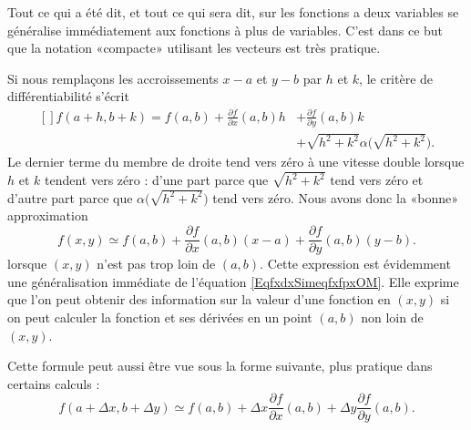 \begin{remark}
    Tout ce qui a été dit, et tout ce qui sera dit, sur les fonctions a deux variables se généralise immédiatement aux fonctions à plus de variables. C'est dans ce but que la notation «compacte» utilisant les vecteurs est très pratique.
\end{remark}

Si nous remplaçons les accroissements $x-a$ et $y-b$ par $h$ et $k$, le critère de différentiabilité s'écrit
\begin{equation}
    \begin{aligned}[]
        f(a+h,b+k)=f(a,b)+\frac{ \partial f }{ \partial x }(a,b)h&+\frac{ \partial f }{ \partial y }(a,b)k\\
        &+\sqrt{h^2+k^2}\alpha\big( \sqrt{h^2+k^2} \big).
    \end{aligned}
\end{equation}
Le dernier terme du membre de droite tend vers zéro à une vitesse double lorsque $h$ et $k$ tendent vers zéro : d'une part parce que $\sqrt{h^2+k^2}$ tend vers zéro et d'autre part parce que $\alpha\big( \sqrt{h^2+k^2} \big)$ tend vers zéro. Nous avons donc la «bonne» approximation
\begin{equation}        \label{EqFormApproxfxyabOM}
    f(x,y)\simeq f(a,b)+\frac{ \partial f }{ \partial x }(a,b)(x-a)+\frac{ \partial f }{ \partial y }(a,b)(y-b).
\end{equation}
lorsque $(x,y)$ n'est pas trop loin de $(a,b)$. Cette expression est évidemment une généralisation immédiate de l'équation \eqref{EqfxdxSimeqfxfpxOM}. Elle exprime que l'on peut obtenir des information sur la valeur d'une fonction en $(x,y)$ si on peut calculer la fonction et ses dérivées en un point $(a,b)$ non loin de $(x,y)$.

Cette formule peut aussi être vue sous la forme suivante, plus pratique dans certains calculs :
\begin{equation}        \label{EqFormApproxfxyabDFOM}
    f(a+\Delta x,b+\Delta y)\simeq f(a,b)+\Delta x\frac{ \partial f }{ \partial x }(a,b)+\Delta y\frac{ \partial f }{ \partial y }(a,b).
\end{equation}


